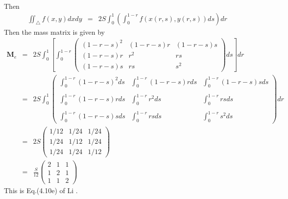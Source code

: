 Then 
\begin{eqnarray}
\iint_\triangle f(x,y) dx dy &=& 2S \int_0^{1} \left(\int_0^{1-r} f(x(r,s),y(r,s))  ds \right) dr 
\end{eqnarray}
Then the mass matrix is given by
\begin{eqnarray}
{\bm M}_e 
&=& 2S \int_{0}^1 \left[ \int_{0}^{1-r}
\left(
\begin{array}{ccc}
(1-r-s)^2 & (1-r-s)r & (1-r-s)s \\
(1-r-s)r & r^2 & rs \\
(1-r-s)s & rs & s^2 
\end{array}
\right)
 ds \right] dr \\
&=& 
2S \int_{0}^1 
\left(
\begin{array}{ccc}
\int_0^{1-r} (1-r-s)^2 ds &\int_0^{1-r} (1-r-s)r ds& \int_0^{1-r} (1-r-s)s ds \\ \\
\int_0^{1-r} (1-r-s)r ds  &\int_0^{1-r} r^2 ds     & \int_0^{1-r} rs ds \\ \\
\int_0^{1-r} (1-r-s)s ds  &\int_0^{1-r} rs ds      & \int_0^{1-r} s^2 ds
\end{array}
\right)
 dr \\
&=& 
2S
\left(
\begin{array}{ccc}
1/12 & 1/24 & 1/24 \\
1/24 & 1/12 & 1/24 \\
1/24 & 1/24 & 1/12
\end{array}
\right)
\\
&=&
\frac{S}{12}
\left(
\begin{array}{ccc}
2 & 1 & 1 \\
1 & 2 & 1 \\
1 & 1 & 2
\end{array}
\right)
\end{eqnarray}
This is Eq.(4.10e) of Li \cite{li06}.











